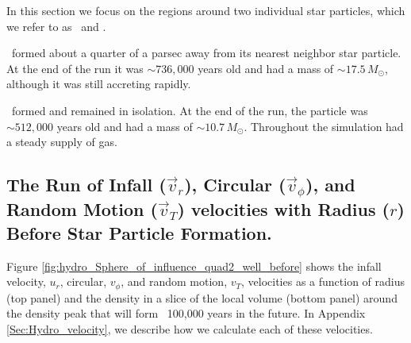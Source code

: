 \documentclass[../dissertation.tex]{subfiles}
\begin{document}
In this section we focus on the regions around  two individual star 
particles, which we refer to as \partA\ and \partB.

\PartA\ formed about a quarter of a parsec away from its nearest neighbor star particle.
At the end of the run it was $\sim 736,000$ years old and had 
a mass of $\sim 17.5 \, M_\odot$, although it was still accreting rapidly.

\PartB\ formed and remained in isolation.
At the end of the run, the particle was $\sim 512,000$ years 
old and had a mass of $\sim 10.7 \, M_\odot$.
Throughout the simulation \partB had a steady supply of gas.

\subsection{The Run of Infall ($\vec{v}_r$), Circular ($\vec{v}_\phi$), and %
 Random Motion ($\vec{v}_T$) velocities with Radius ($r$) Before Star Particle Formation.}

Figure \ref{fig:hydro_Sphere_of_influence_quad2_well_before} shows the infall 
velocity, $u_r$, circular, $v_{\phi}$, and random motion, $v_T$, velocities as a function of  radius (top panel) and the density in a slice of the local volume 
(bottom panel) around the density peak that will form \partA\ 100,000 years in the future. 
In Appendix \ref{Sec:Hydro_velocity}, we describe how we calculate each of these velocities.
\end{document}
